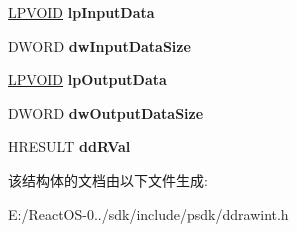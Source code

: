 \begin{DoxyCompactItemize}
\hyperlink{interfacevoid}{L\+P\+V\+O\+ID} {\bfseries lp\+Input\+Data}
\item 
\mbox{\label{struct___d_d___r_e_n_d_e_r_m_o_c_o_m_p_d_a_t_a_a455848dffad82fb9393d5851a979c53b}} 
D\+W\+O\+RD {\bfseries dw\+Input\+Data\+Size}
\item 
\mbox{\label{struct___d_d___r_e_n_d_e_r_m_o_c_o_m_p_d_a_t_a_a1999537d231df6f39dc935674d414f77}} 
\hyperlink{interfacevoid}{L\+P\+V\+O\+ID} {\bfseries lp\+Output\+Data}
\item 
\mbox{\label{struct___d_d___r_e_n_d_e_r_m_o_c_o_m_p_d_a_t_a_a9fdd9d0d1579f9bdfbdd21cab951bb27}} 
D\+W\+O\+RD {\bfseries dw\+Output\+Data\+Size}
\item 
\mbox{\label{struct___d_d___r_e_n_d_e_r_m_o_c_o_m_p_d_a_t_a_a701c86d25dd4b9f5cab9a2d605be4a38}} 
H\+R\+E\+S\+U\+LT {\bfseries dd\+R\+Val}
\end{DoxyCompactItemize}


该结构体的文档由以下文件生成\+:\begin{DoxyCompactItemize}
\item 
E\+:/\+React\+O\+S-\/0../sdk/include/psdk/ddrawint.\+h\end{DoxyCompactItemize}
